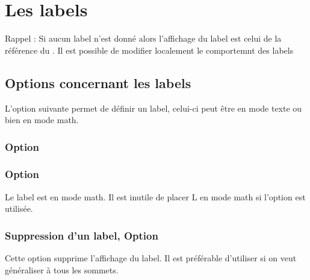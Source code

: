 
\section{Les labels}

Rappel : Si aucun label n'est donné alors l'affichage du label est celui de la référence du . Il est possible de modifier localement  le comportemnt des labels

\subsection{Options concernant les labels}

L'option suivante permet de définir un label, celui-ci peut être en mode texte ou bien en mode math. 

\subsubsection{Option } 

\begin{tkzexample}[latex=7cm,small]
\end{tkzexample}

\subsubsection{Option } 
Le label est en mode math. Il est inutile de placer L en mode math si l'option est utilisée.

\begin{tkzexample}[latex=7cm,small]
\end{tkzexample}


\subsubsection{Suppression d'un  label, Option } 
Cette option supprime l'affichage du label. Il est préférable d'utiliser  si on veut généraliser à tous les sommets.   

